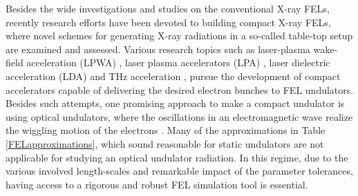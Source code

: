 Besides the wide investigations and studies on the conventional X-ray FELs, recently research efforts have been devoted to building compact X-ray FELs, where novel schemes for generating X-ray radiations in a so-called table-top setup are examined and assessed.
%
Various research topics such as laser-plasma wake-field acceleration (LPWA) \cite{mangles2004monoenergetic,faure2004laser,geddes2004high}, laser plasma accelerators (LPA) \cite{tajima1979laser,lundh2011few}, laser dielectric acceleration (LDA) \cite{england2014dielectric} and THz acceleration \cite{nanni2015terahertz,fallahi2016short}, pursue the development of compact accelerators capable of delivering the desired electron bunches to FEL undulators.
%
Besides such attempts, one promising approach to make a compact undulator is using optical undulators, where the oscillations in an electromagnetic wave realize the wiggling motion of the electrons \cite{kartner2016axsis}.
%
Many of the approximations in Table \ref{FELapproximations}, which sound reasonable for static undulators are not applicable for studying an optical undulator radiation.
%
In this regime, due to the various involved length-scales and remarkable impact of the parameter tolerances, having access to a rigorous and robust FEL simulation tool is essential.


